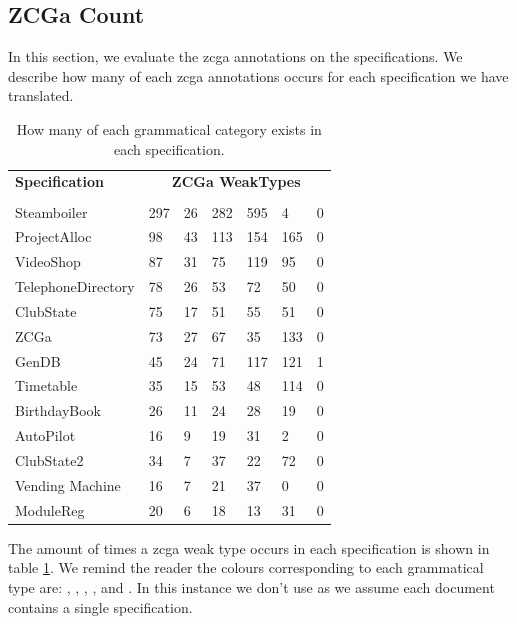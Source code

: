 \subsection{ZCGa Count}

In this section, we evaluate the \gls{zcga} annotations on the specifications.
We describe how many of each \gls{zcga} annotations occurs for each
specification we have translated.

\begin{table}[H]
\centering
\begin{tabular}{|l |l | l |l | l| l | l |}
\hline
\textbf{Specification} & \multicolumn{6}{c|}{\textbf{ZCGa WeakTypes}}\\
\cline{2-7}
 & \cgatext{} & \declaration{} & \expression{} & \term{} & \set{} &
 {} \\
\hline
Steamboiler & 297 & 26 & 282 & 595 & 4 & 0 \\
ProjectAlloc & 98 & 43 & 113 & 154 & 165 & 0\\
VideoShop  & 87 & 31 & 75 & 119 & 95 & 0 \\
TelephoneDirectory & 78 & 26 & 53 & 72 & 50 & 0 \\
ClubState & 75 & 17 & 51 & 55 & 51 & 0 \\
ZCGa & 73 & 27 & 67 & 35 & 133 & 0 \\
GenDB & 45 & 24 & 71 & 117 & 121 & 1 \\
Timetable & 35 & 15 & 53 & 48 & 114 & 0 \\
BirthdayBook & 26 & 11 & 24 & 28 & 19 & 0 \\
AutoPilot & 16 & 9 & 19 & 31 & 2 & 0\\
ClubState2 & 34 & 7 & 37 & 22 & 72 & 0 \\
Vending Machine & 16 & 7 & 21 & 37 & 0 & 0 \\
ModuleReg & 20 & 6 & 18 & 13 & 31 & 0 \\
\hline
\end{tabular}
\caption{How many of each grammatical category exists in each specification. \label{tab:specgram}}
\end{table}

The amount of times a \gls{zcga} weak type occurs in each specification is shown
in table \ref{tab:specgram}. We remind the reader the colours corresponding to
each grammatical type are: , ,
, ,  and . In
this instance we don't use  as we assume each
document contains a single specification.


